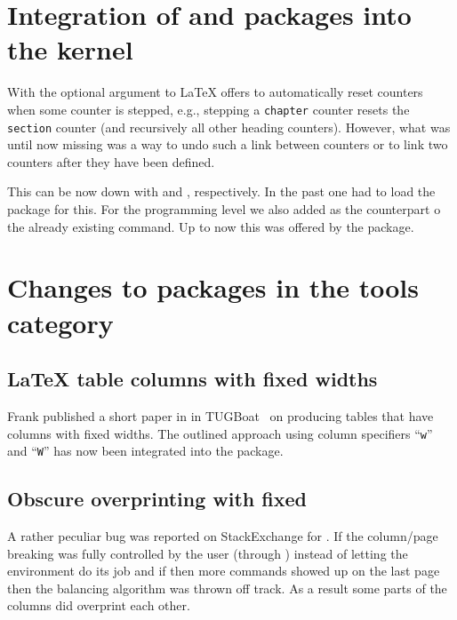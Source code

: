 \documentclass{ltnews}
\begin{document}
\section{Integration of  and  packages 
         into the kernel}

With the optional argument to  \LaTeX{} offers to
automatically reset counters when some counter is stepped, e.g.,
stepping a \texttt{chapter} counter resets the \texttt{section}
counter (and recursively all other heading counters). However, what
was until now missing was a way to undo such a link between counters
or to link two counters after they have been defined.

This can be now down with  and ,
respectively. In the past one had to load the  package
for this. For the programming level we also added
 as the counterpart o the already existing
 command. Up to now this was offered by the
 package.



\section{Changes to packages in the tools category}

\subsection{\LaTeX{} table columns with fixed widths}

Frank published a short paper in in
TUGBoat~\cite{Mittelbach:TB38-2-213} on producing tables that have
columns with fixed widths. The outlined approach using column
specifiers ``\texttt{w}'' and ``\texttt{W}'' has now been integrated
into the  package.

\subsection{Obscure overprinting with  fixed}

A rather peculiar bug was reported on StackExchange for
. If the column/page breaking was fully controlled by
the user (through ) instead of letting the environment
do its job and if then more  commands showed up on the
last page then the balancing algorithm was thrown off track.
As a result some parts of the columns did overprint each other.
\end{document}
